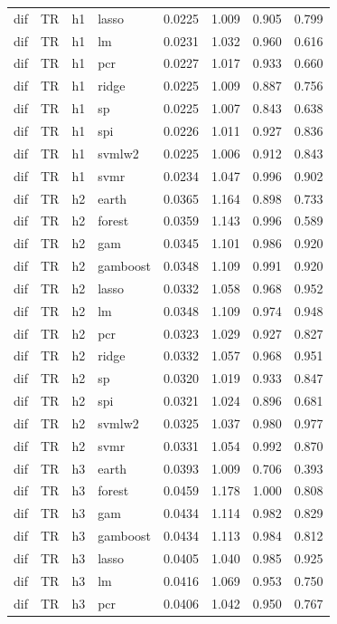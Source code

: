 \begin{ThreePartTable}
\begin{longtable}[t]{llclcccc}
dif & TR & h1 & lasso & 0.0225 & 1.009 & 0.905 & 0.799\\
dif & TR & h1 & lm & 0.0231 & 1.032 & 0.960 & 0.616\\
dif & TR & h1 & pcr & 0.0227 & 1.017 & 0.933 & 0.660\\
dif & TR & h1 & ridge & 0.0225 & 1.009 & 0.887 & 0.756\\
dif & TR & h1 & sp & 0.0225 & 1.007 & 0.843 & 0.638\\
dif & TR & h1 & spi & 0.0226 & 1.011 & 0.927 & 0.836\\
dif & TR & h1 & svmlw2 & 0.0225 & 1.006 & 0.912 & 0.843\\
dif & TR & h1 & svmr & 0.0234 & 1.047 & 0.996 & 0.902\\
\addlinespace
dif & TR & h2 & earth & 0.0365 & 1.164 & 0.898 & 0.733\\
dif & TR & h2 & forest & 0.0359 & 1.143 & 0.996 & 0.589\\
dif & TR & h2 & gam & 0.0345 & 1.101 & 0.986 & 0.920\\
dif & TR & h2 & gamboost & 0.0348 & 1.109 & 0.991 & 0.920\\
dif & TR & h2 & lasso & 0.0332 & 1.058 & 0.968 & 0.952\\
dif & TR & h2 & lm & 0.0348 & 1.109 & 0.974 & 0.948\\
dif & TR & h2 & pcr & 0.0323 & 1.029 & 0.927 & 0.827\\
dif & TR & h2 & ridge & 0.0332 & 1.057 & 0.968 & 0.951\\
dif & TR & h2 & sp & 0.0320 & 1.019 & 0.933 & 0.847\\
dif & TR & h2 & spi & 0.0321 & 1.024 & 0.896 & 0.681\\
dif & TR & h2 & svmlw2 & 0.0325 & 1.037 & 0.980 & 0.977\\
dif & TR & h2 & svmr & 0.0331 & 1.054 & 0.992 & 0.870\\
\addlinespace
dif & TR & h3 & earth & 0.0393 & 1.009 & 0.706 & 0.393\\
dif & TR & h3 & forest & 0.0459 & 1.178 & 1.000 & 0.808\\
dif & TR & h3 & gam & 0.0434 & 1.114 & 0.982 & 0.829\\
dif & TR & h3 & gamboost & 0.0434 & 1.113 & 0.984 & 0.812\\
dif & TR & h3 & lasso & 0.0405 & 1.040 & 0.985 & 0.925\\
dif & TR & h3 & lm & 0.0416 & 1.069 & 0.953 & 0.750\\
dif & TR & h3 & pcr & 0.0406 & 1.042 & 0.950 & 0.767\\

\end{longtable}
\end{ThreePartTable}
